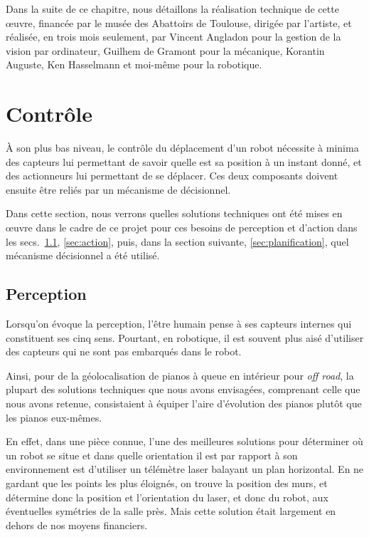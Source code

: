 \documentclass[french,A4paper,]{book}
\begin{document}
Dans la suite de ce chapitre, nous détaillons la réalisation technique
de cette œuvre, financée par le musée des Abattoirs de Toulouse, dirigée
par l'artiste, et réalisée, en trois mois seulement, par Vincent
Angladon pour la gestion de la vision par ordinateur, Guilhem de Gramont
pour la mécanique, Korantin Auguste, Ken Hasselmann et moi-même pour la
robotique.

\section{Contrôle}\label{contruxf4le}

À son plus bas niveau, le contrôle du déplacement d'un robot nécessite à
minima des capteurs lui permettant de savoir quelle est sa position à un
instant donné, et des actionneurs lui permettant de se déplacer. Ces
deux composants doivent ensuite être reliés par un mécanisme de
décisionnel.

Dans cette section, nous verrons quelles solutions techniques ont été
mises en œuvre dans le cadre de ce projet pour ces besoins de perception
et d'action dans les secs.~\ref{sec:perception}, \ref{sec:action}, puis,
dans la section suivante, \ref{sec:planification}, quel mécanisme
décisionnel a été utilisé.

\subsection{Perception}\label{sec:perception}

Lorsqu'on évoque la perception, l'être humain pense à ses capteurs
internes qui constituent ses cinq sens. Pourtant, en robotique, il est
souvent plus aisé d'utiliser des capteurs qui ne sont pas embarqués dans
le robot.

Ainsi, pour de la géolocalisation de pianos à queue en intérieur pour
\emph{off road}, la plupart des solutions techniques que nous avons
envisagées, comprenant celle que nous avons retenue, consistaient à
équiper l'aire d'évolution des pianos plutôt que les pianos eux-mêmes.

En effet, dans une pièce connue, l'une des meilleures solutions pour
déterminer où un robot se situe et dans quelle orientation il est par
rapport à son environnement est d'utiliser un télémètre laser balayant
un plan horizontal. En ne gardant que les points les plus éloignés, on
trouve la position des murs, et détermine donc la position et
l'orientation du laser, et donc du robot, aux éventuelles symétries de
la salle près. Mais cette solution était largement en dehors de nos
moyens financiers.
\end{document}
